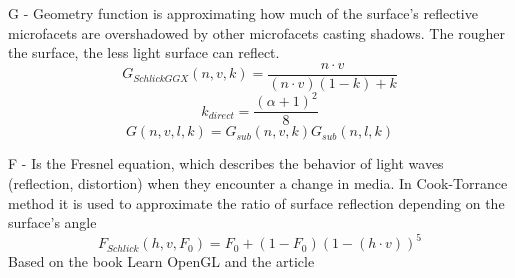 G - Geometry function is approximating how much of the surface's reflective microfacets are overshadowed by other microfacets casting shadows. The rougher the surface, the less light surface can reflect.
\begin{equation}
G_{SchlickGGX}(n, v, k) = \frac{n \cdot v}{(n \cdot v)(1 - k) + k}
\end{equation}
\begin{equation}
k_{direct} = \frac{(\alpha + 1)^2}{8}
\end{equation}
\begin{equation}
G(n, v, l, k) = G_{sub}(n, v, k) G_{sub}(n, l, k)
\end{equation}

F - Is the Fresnel equation, which describes the behavior of light waves (reflection, distortion) when they encounter a change in media. In Cook-Torrance method it is used to approximate the ratio of surface reflection depending on the surface's angle\\ 
\begin{equation}
F_{Schlick}(h, v, F_0) = F_0 + (1 - F_0)(1 - (h \cdot v))^5
\end{equation}
Based on the book Learn OpenGL \cite{learnopengl} and the article \cite{pbrreferences}
